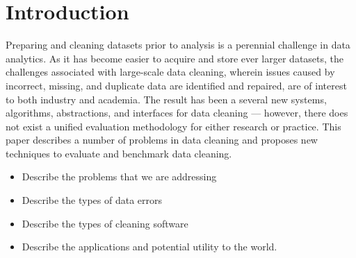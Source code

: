\section{Introduction}
Preparing and cleaning datasets prior to analysis is a perennial challenge in data analytics. As it has become easier to acquire and store ever larger datasets, the challenges associated with large-scale data cleaning, wherein issues caused by incorrect, missing, and duplicate data are identified and repaired, are of interest to both industry and academia. The result has been a several new systems, algorithms, abstractions, and interfaces for data cleaning --- however, there does not exist a unified evaluation methodology for either research or practice. This paper describes a number of problems in data cleaning and proposes new techniques to evaluate and benchmark data cleaning.

\begin{itemize}
    \item Describe the problems that we are addressing
    \item Describe the types of data errors
    \item Describe the types of cleaning software
    \item Describe the applications and potential utility to the world.
\end{itemize}